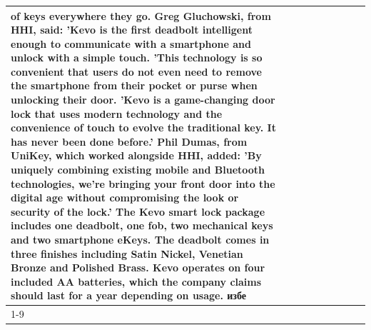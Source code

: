 \begin{table}[H]
\begin{tabular}{lllrlllll}
of keys everywhere they go. Greg Gluchowski, from HHI, said: 'Kevo is the first deadbolt intelligent enough to communicate with a smartphone and unlock with a simple touch. 'This technology is so convenient that users do not even need to remove the smartphone from their pocket or purse when unlocking their door. 'Kevo is a game-changing door lock that uses modern technology and the convenience of touch to evolve the traditional key. It has never been done before.' Phil Dumas, from UniKey, which worked alongside HHI, added: 'By uniquely combining existing mobile and Bluetooth technologies, we’re bringing your front door into the digital age without compromising the look or security of the lock.' The Kevo smart lock package includes one deadbolt, one fob, two mechanical keys and two smartphone eKeys. The deadbolt comes in three finishes including Satin Nickel, Venetian Bronze and Polished Brass. Kevo operates on four included AA batteries, which the company claims should last for a year depending on usage. избе \\
\cline{1-9}

\end{tabular}
\end{table}
